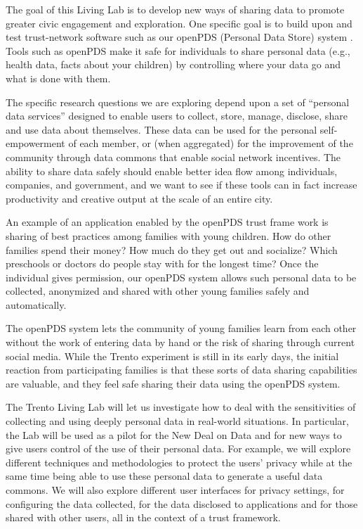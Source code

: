 The goal of this Living Lab is to develop new ways of sharing data to promote greater civic engagement and exploration. One specific goal is to build upon and test trust-network software such as our openPDS (Personal Data Store) system . Tools such as openPDS make it safe for individuals to share personal data (e.g., health data, facts about your children) by controlling where your data go and what is done with them.

The specific research questions we are exploring depend upon a set of “personal data services” designed to enable users to collect, store, manage, disclose, share and use data about themselves. These data can be used for the personal self-empowerment of each member, or (when aggregated) for the improvement of the community through data commons that enable social network incentives. The ability to share data safely should enable better idea flow among individuals, companies, and government, and we want to see if these tools can in fact increase productivity and creative output at the scale of an entire city.

An example of an application enabled by the openPDS trust frame work is sharing of best practices among families with young children. How do other families spend their money? How much do they get out and socialize? Which preschools or doctors do people stay with for the longest time? Once the individual gives permission, our openPDS system allows such personal data to be collected, anonymized and shared with other young families safely and automatically.

The openPDS system lets the community of young families learn from each other without the work of entering data by hand or the risk of sharing through current social media. While the Trento experiment is still in its early days, the initial reaction from participating families is that these sorts of data sharing capabilities are valuable, and they feel safe sharing their data using the openPDS system.

The Trento Living Lab will let us investigate how to deal with the sensitivities of collecting and using deeply personal data in real-world situations. In particular, the Lab will be used as a pilot for the New Deal on Data and for new ways to give users control of the use of their personal data. For example, we will explore different techniques and methodologies to protect the users’ privacy while at the same time being able to use these personal data to generate a useful data commons. We will also explore different user interfaces for privacy settings, for configuring the data collected, for the data disclosed to applications and for those shared with other users, all in the context of a trust framework.
